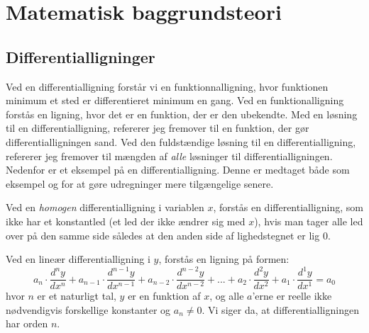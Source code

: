 \section{Matematisk baggrundsteori}
\subsection{Differentialligninger}
\newcommand{\LosEks}{$ \{ c\cdot e^{kx}|c\in \mR \} $}%
Ved en differentialligning forstår vi en funktionnalligning, hvor funktionen minimum et sted er differentieret minimum en gang.
Ved en funktionalligning forstås en ligning, hvor det er en funktion, der er den ubekendte. 
Med en løsning til en differentialligning, refererer jeg fremover til en funktion, der gør differentialligningen sand. 
Ved den fuldstændige løsning til en differentialligning, refererer jeg fremover til mængden af \emph{alle} løsninger til differentialligningen. 
Nedenfor er et eksempel på en differentialligning. 
Denne er medtaget både som eksempel og for at gøre udregninger mere tilgængelige senere.

\begin{definition}
Ved en \textit{homogen} differentialligning i variablen $x$, forstås en differentialligning, som ikke har et konstantled (et led der ikke ændrer sig med $x$), hvis man tager alle led over på den samme side således at den anden side af lighedstegnet er lig $0$.
\end{definition}

\newcommand{\LDiff}[1]{a_{#1} \cdot \frac{d^{#1}y}{d x^{#1}}}
\begin{definition}
Ved en lineær differentialligning i $y$, forstås en ligning på formen:
$$\LDiff{n} + \LDiff{n-1} + \LDiff{n-2}+...+\LDiff{2}+\LDiff{1}=a_0$$
hvor $n$ er et naturligt tal, $y$ er en funktion af $x$, og alle $a$'erne er reelle ikke nødvendigvis forskellige konstanter og $a_n \neq 0$.
Vi siger da, at differentialligningen har orden $n$.

\end{definition}



